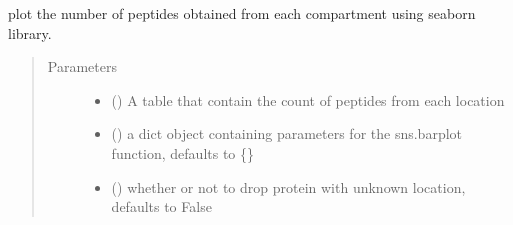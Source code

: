 \documentclass[letterpaper,10pt,english]{sphinxmanual}
\begin{document}
\begin{fulllineitems}
\label{\detokenize{IPTK.Visualization:IPTK.Visualization.vizTools.plot_num_peptides_per_location}}
plot the number of peptides obtained from each compartment using seaborn library.
\begin{quote}\begin{description}
\item[{Parameters}] \leavevmode\begin{itemize}
\item {} 
 () \textendash{} A table that contain the count of peptides from each  location

\item {} 
 (\sphinxstyleliteralemphasis{\sphinxupquote{{[}}}\sphinxstyleliteralemphasis{\sphinxupquote{,}}\sphinxstyleliteralemphasis{\sphinxupquote{{]}}}\sphinxstyleliteralemphasis{\sphinxupquote{, }}) \textendash{} a dict object containing parameters for the sns.barplot function, defaults to \{\}

\item {} 
 (\sphinxstyleliteralemphasis{\sphinxupquote{, }}) \textendash{} whether or not to drop protein with unknown location, defaults to False


\end{itemize}
\end{description}
\end{quote}
\end{fulllineitems}
\end{document}
